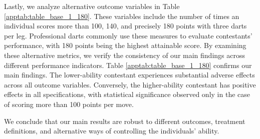 \documentclass[11pt,a4paper]{article}
\begin{document}
Lastly, we analyze alternative outcome variables in Table \ref{apptab:table_base_1_180}. These variables include the number of times an individual scores more than 100, 140, and precisely 180 points with three darts per leg. Professional darts commonly use these measures to evaluate contestants' performance, with 180 points being the highest attainable score. By examining these alternative metrics, we verify the consistency of our main findings across different performance indicators. Table \ref{apptab:table_base_1_180} confirms our main findings. The lower-ability contestant experiences substantial adverse effects across all outcome variables. Conversely, the higher-ability contestant has positive effects in all specifications, with statistical significance observed only in the case of scoring more than 100 points per move.\par

We conclude that our main results are robust to different outcomes, treatment definitions, and alternative ways of controlling the individuals' ability. \par
\end{document}

